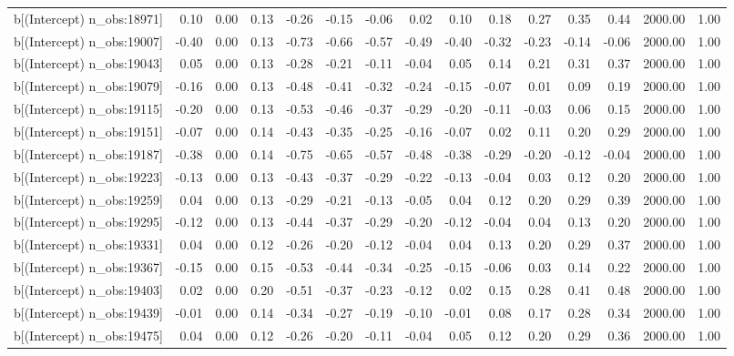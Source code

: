 \begin{table}[ht]
\begin{tabular}{rrrrrrrrrrrrrrr}
  b[(Intercept) n\_obs:18971] & 0.10 & 0.00 & 0.13 & -0.26 & -0.15 & -0.06 & 0.02 & 0.10 & 0.18 & 0.27 & 0.35 & 0.44 & 2000.00 & 1.00 \\ 
  b[(Intercept) n\_obs:19007] & -0.40 & 0.00 & 0.13 & -0.73 & -0.66 & -0.57 & -0.49 & -0.40 & -0.32 & -0.23 & -0.14 & -0.06 & 2000.00 & 1.00 \\ 
  b[(Intercept) n\_obs:19043] & 0.05 & 0.00 & 0.13 & -0.28 & -0.21 & -0.11 & -0.04 & 0.05 & 0.14 & 0.21 & 0.31 & 0.37 & 2000.00 & 1.00 \\ 
  b[(Intercept) n\_obs:19079] & -0.16 & 0.00 & 0.13 & -0.48 & -0.41 & -0.32 & -0.24 & -0.15 & -0.07 & 0.01 & 0.09 & 0.19 & 2000.00 & 1.00 \\ 
  b[(Intercept) n\_obs:19115] & -0.20 & 0.00 & 0.13 & -0.53 & -0.46 & -0.37 & -0.29 & -0.20 & -0.11 & -0.03 & 0.06 & 0.15 & 2000.00 & 1.00 \\ 
  b[(Intercept) n\_obs:19151] & -0.07 & 0.00 & 0.14 & -0.43 & -0.35 & -0.25 & -0.16 & -0.07 & 0.02 & 0.11 & 0.20 & 0.29 & 2000.00 & 1.00 \\ 
  b[(Intercept) n\_obs:19187] & -0.38 & 0.00 & 0.14 & -0.75 & -0.65 & -0.57 & -0.48 & -0.38 & -0.29 & -0.20 & -0.12 & -0.04 & 2000.00 & 1.00 \\ 
  b[(Intercept) n\_obs:19223] & -0.13 & 0.00 & 0.13 & -0.43 & -0.37 & -0.29 & -0.22 & -0.13 & -0.04 & 0.03 & 0.12 & 0.20 & 2000.00 & 1.00 \\ 
  b[(Intercept) n\_obs:19259] & 0.04 & 0.00 & 0.13 & -0.29 & -0.21 & -0.13 & -0.05 & 0.04 & 0.12 & 0.20 & 0.29 & 0.39 & 2000.00 & 1.00 \\ 
  b[(Intercept) n\_obs:19295] & -0.12 & 0.00 & 0.13 & -0.44 & -0.37 & -0.29 & -0.20 & -0.12 & -0.04 & 0.04 & 0.13 & 0.20 & 2000.00 & 1.00 \\ 
  b[(Intercept) n\_obs:19331] & 0.04 & 0.00 & 0.12 & -0.26 & -0.20 & -0.12 & -0.04 & 0.04 & 0.13 & 0.20 & 0.29 & 0.37 & 2000.00 & 1.00 \\ 
  b[(Intercept) n\_obs:19367] & -0.15 & 0.00 & 0.15 & -0.53 & -0.44 & -0.34 & -0.25 & -0.15 & -0.06 & 0.03 & 0.14 & 0.22 & 2000.00 & 1.00 \\ 
  b[(Intercept) n\_obs:19403] & 0.02 & 0.00 & 0.20 & -0.51 & -0.37 & -0.23 & -0.12 & 0.02 & 0.15 & 0.28 & 0.41 & 0.48 & 2000.00 & 1.00 \\ 
  b[(Intercept) n\_obs:19439] & -0.01 & 0.00 & 0.14 & -0.34 & -0.27 & -0.19 & -0.10 & -0.01 & 0.08 & 0.17 & 0.28 & 0.34 & 2000.00 & 1.00 \\ 
  b[(Intercept) n\_obs:19475] & 0.04 & 0.00 & 0.12 & -0.26 & -0.20 & -0.11 & -0.04 & 0.05 & 0.12 & 0.20 & 0.29 & 0.36 & 2000.00 & 1.00 \\ 

\end{tabular}
\end{table}
